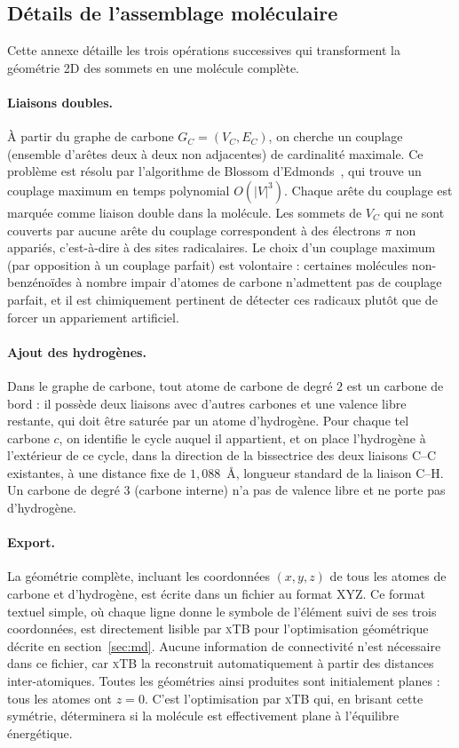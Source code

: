 \documentclass[11pt,a4paper]{article}
\newcommand{\xtb}{\textsc{xTB}}
\begin{document}
\subsection{Détails de l'assemblage moléculaire}
\label{sec:assemblage_detail}

Cette annexe détaille les trois opérations successives qui transforment la géométrie 2D des sommets en une molécule complète.

\paragraph{Liaisons doubles.}
À partir du graphe de carbone $G_C = (V_C, E_C)$, on cherche un couplage (ensemble d'arêtes deux à deux non adjacentes) de cardinalité maximale. Ce problème est résolu par l'algorithme de Blossom d'Edmonds~\cite{edmonds1965}, qui trouve un couplage maximum en temps polynomial $O(|V|^3)$. Chaque arête du couplage est marquée comme liaison double dans la molécule. Les sommets de $V_C$ qui ne sont couverts par aucune arête du couplage correspondent à des électrons $\pi$ non appariés, c'est-à-dire à des sites radicalaires. Le choix d'un couplage maximum (par opposition à un couplage parfait) est volontaire : certaines molécules non-benzénoïdes à nombre impair d'atomes de carbone n'admettent pas de couplage parfait, et il est chimiquement pertinent de détecter ces radicaux plutôt que de forcer un appariement artificiel.

\paragraph{Ajout des hydrogènes.}
Dans le graphe de carbone, tout atome de carbone de degré $2$ est un
carbone de bord : il possède deux liaisons avec d'autres carbones et
une valence libre restante, qui doit être saturée par un atome
d'hydrogène. Pour chaque tel carbone $c$, on identifie le cycle auquel
il appartient, et on place l'hydrogène à l'extérieur de ce cycle, dans
la direction de la bissectrice des deux liaisons C--C existantes, à
une distance fixe de $1{,}088$~\AA{}, longueur standard de la liaison
C--H. Un carbone de degré $3$ (carbone interne) n'a pas de valence
libre et ne porte pas d'hydrogène.

\paragraph{Export.}
La géométrie complète, incluant les coordonnées $(x,y,z)$ de tous les
atomes de carbone et d'hydrogène, est écrite dans un fichier au format
XYZ. Ce format textuel simple, où chaque ligne donne le symbole de
l'élément suivi de ses trois coordonnées, est directement lisible par
\xtb{} pour l'optimisation géométrique décrite en section~\ref{sec:md}.
Aucune information de connectivité n'est nécessaire dans ce fichier,
car \xtb{} la reconstruit automatiquement à partir des distances
inter-atomiques. Toutes les géométries ainsi produites sont
initialement planes : tous les atomes ont $z = 0$. C'est l'optimisation
par \xtb{} qui, en brisant cette symétrie, déterminera si la molécule
est effectivement plane à l'équilibre énergétique.
\end{document}
